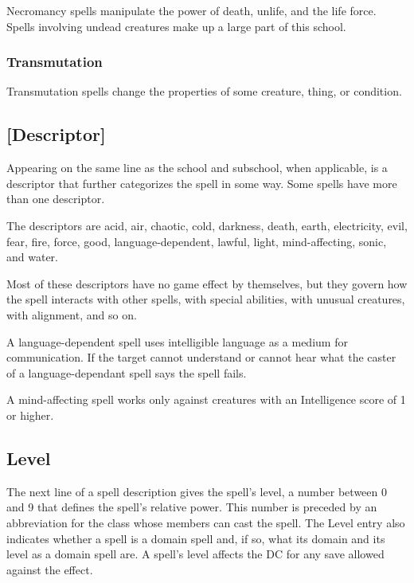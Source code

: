 Necromancy spells manipulate the power of death, unlife, and the life force. Spells 
involving undead creatures make up a large part of this school. 

\subsubsection{Transmutation}

Transmutation spells change the properties of some creature, thing, or condition. 

\subsection{[Descriptor]}

Appearing on the same line as the school and subschool, when applicable, is a descriptor 
that further categorizes the spell in some way. Some spells have more than one 
descriptor.

The descriptors are acid, air, chaotic, cold, darkness, death, earth, electricity, 
evil, fear, fire, force, good, language-dependent, lawful, light, mind-affecting, 
sonic, and water.

Most of these descriptors have no game effect by themselves, but they govern how 
the spell interacts with other spells, with special abilities, with unusual creatures, 
with alignment, and so on.

A language-dependent spell uses intelligible language as a medium for communication. 
If the target cannot understand or cannot hear what the caster of a language-dependant 
spell says the spell fails.

A mind-affecting spell works only against creatures with an Intelligence score 
of 1 or higher.

\subsection{Level}

The next line of a spell description gives the spell's level, a number between 
0 and 9 that defines the spell's relative power. This number is preceded by an 
abbreviation for the class whose members can cast the spell. The Level entry also 
indicates whether a spell is a domain spell and, if so, what its domain and its 
level as a domain spell are. A spell's level affects the DC for any save allowed 
against the effect.


